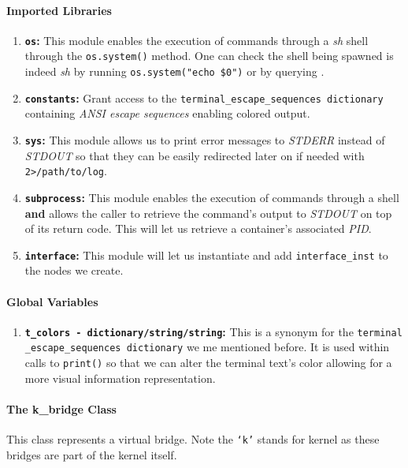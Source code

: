     \paragraph{Imported Libraries}
        \begin{enumerate}
            \item \textbf{\texttt{os}:} This module enables the execution of commands through a \textit{sh} shell through the \texttt{os.system()} method. One can check the shell being spawned is indeed \textit{sh} by running \texttt{\allowbreak os.system("echo \$0")} or by querying \cite{bib:man-system}.
            \item \textbf{\texttt{constants}:} Grant access to the \texttt{\allowbreak terminal\_escape\_sequences dictionary} containing \textit{ANSI escape sequences} enabling colored output.
            \item \textbf{\texttt{sys}:} This module allows us to print error messages to \textit{STDERR} instead of \textit{STDOUT} so that they can be easily redirected later on if needed with \texttt{2>/path/to/log}.
            \item \textbf{\texttt{subprocess}:} This module enables the execution of commands through a shell \textbf{and} allows the caller to retrieve the command's output to \textit{STDOUT} on top of its return code. This will let us retrieve a container's associated \textit{PID}.
            \item \textbf{\texttt{interface}:} This module will let us instantiate and add \texttt{interface\_inst} to the nodes we create.
        \end{enumerate}

    \paragraph{Global Variables}
        \begin{enumerate}
            \item \textbf{\texttt{\allowbreak t\_colors - dictionary/string/string}:} This is a synonym for the \texttt{\allowbreak terminal \_escape\_sequences dictionary} we me mentioned before. It is used within calls to \texttt{print()} so that we can alter the terminal text's color allowing for a more visual information representation.
        \end{enumerate}

    \paragraph{The k\_bridge Class}
        This class represents a virtual bridge. Note the \texttt{`k'} stands for kernel as these bridges are part of the kernel itself.

